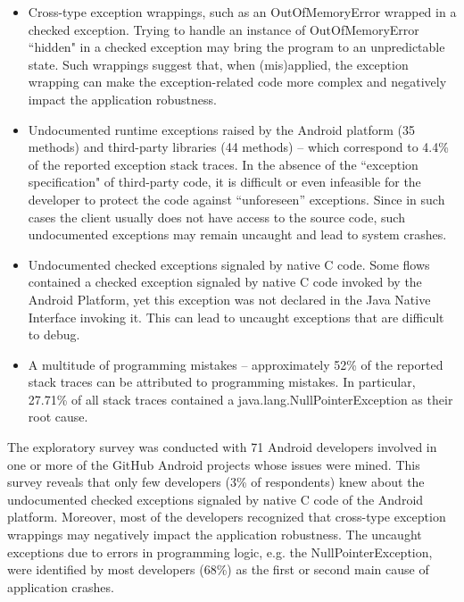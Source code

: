 \begin{itemize}

   \item  Cross-type exception wrappings, such as an OutOfMemoryError wrapped in a checked exception.
Trying to handle an instance of OutOfMemoryError ``hidden" in  a checked exception may bring the program
 to an unpredictable state. Such wrappings suggest that, when (mis)applied, the exception wrapping can make 
the exception-related code more complex and negatively impact the application robustness.

  \item  Undocumented runtime exceptions raised by the Android platform (35 methods) and  third-party libraries (44 methods) --
 which correspond to 4.4\% of the reported exception stack traces.
In the absence of the ``exception specification" of third-party code, it is difficult or 
even infeasible for the developer to protect the code against ``unforeseen'' exceptions. 
Since in such cases the client usually does not have access to the source code, such undocumented 
exceptions may remain uncaught and lead to system crashes. 

   \item Undocumented checked exceptions signaled by native C code.  Some flows contained a checked 
exception signaled by native C code invoked by the Android Platform, yet this exception was not declared
 in the Java Native Interface invoking it. This can lead to uncaught exceptions that are 
difficult to debug. 

 \item A multitude of programming mistakes -- approximately 52\% of the reported stack traces can 
be attributed to programming mistakes. In particular, 27.71\% of all stack traces contained a java.lang.NullPointerException 
as their root cause.

\end{itemize}

The exploratory survey was conducted with 71 Android developers involved in one or more of the 
GitHub Android projects whose issues were mined. This survey reveals that only few developers (3\% of respondents)
 knew about the undocumented checked exceptions signaled by native C code of the Android platform. 
Moreover, most of the developers recognized that cross-type exception wrappings may
negatively impact the application robustness. The uncaught exceptions due to errors in programming 
logic, e.g. the NullPointerException, were identified by most developers (68\%) as the first or second main cause 
of application crashes.

